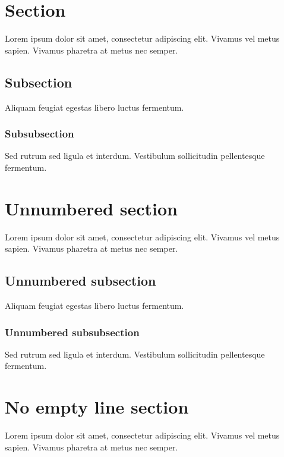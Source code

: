 \documentclass[10pt]{extarticle}
\date{}
\begin{document}

\section{Section}

Lorem ipsum dolor sit amet, consectetur adipiscing elit. Vivamus vel metus sapien. Vivamus pharetra at metus nec semper. 

\subsection{Subsection}

Aliquam feugiat egestas libero luctus fermentum. 

\subsubsection{Subsubsection}

Sed rutrum sed ligula et interdum. Vestibulum sollicitudin pellentesque fermentum. 

\section*{Unnumbered section}

Lorem ipsum dolor sit amet, consectetur adipiscing elit. Vivamus vel metus sapien. Vivamus pharetra at metus nec semper. 

\subsection*{Unnumbered subsection}

Aliquam feugiat egestas libero luctus fermentum. 

\subsubsection*{Unnumbered subsubsection}

Sed rutrum sed ligula et interdum. Vestibulum sollicitudin pellentesque fermentum. 

\section{No empty line section}

Lorem ipsum dolor sit amet, consectetur adipiscing elit. Vivamus vel metus sapien. Vivamus pharetra at metus nec semper. 
\end{document}
